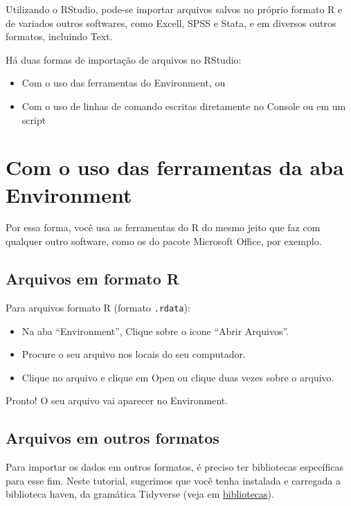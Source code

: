 \documentclass[
  10pt,
  brazil,
  a4paper,
  twoside, notitlepage, openright]{book}
\providecommand{\tightlist}{%
  \setlength{\itemsep}{0pt}\setlength{\parskip}{0pt}}
\begin{document}
Utilizando o RStudio, pode-se importar arquivos salvos no próprio formato R e de variados outros softwares, como Excell, SPSS e Stata, e em diversos outros formatos, incluindo Text.

Há duas formas de importação de arquivos no RStudio:

\begin{itemize}
\tightlist
\item
  Com o uso das ferramentas do Environment, ou
\item
  Com o uso de linhas de comando escritas diretamente no Console ou em um script
\end{itemize}

\hypertarget{com-o-uso-das-ferramentas-da-aba-environment}{%
\section{Com o uso das ferramentas da aba Environment}\label{com-o-uso-das-ferramentas-da-aba-environment}}

Por essa forma, você usa as ferramentas do R do mesmo jeito que faz com qualquer outro software, como os do pacote Microsoft Office, por exemplo.

\hypertarget{arquivos-em-formato-r}{%
\subsection{Arquivos em formato R}\label{arquivos-em-formato-r}}

Para arquivos formato R (formato \texttt{.rdata}):

\begin{itemize}
\tightlist
\item
  Na aba ``Environment'', Clique sobre o icone ``Abrir Arquivos''.
\item
  Procure o seu arquivo nos locais do seu computador.
\item
  Clique no arquivo e clique em Open ou clique duas vezes sobre o arquivo.
\end{itemize}

Pronto! O seu arquivo vai aparecer no Environment.

\hypertarget{arquivos-em-outros-formatos}{%
\subsection{Arquivos em outros formatos}\label{arquivos-em-outros-formatos}}

Para importar os dados em outros formatos, é preciso ter bibliotecas específicas para esse fim. Neste tutorial, sugerimos que você tenha instalada e carregada a biblioteca haven, da gramática Tidyverse (veja em \protect\hyperlink{biblio}{bibliotecas}).
\end{document}
